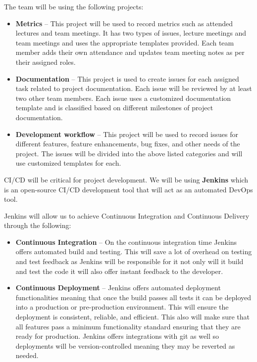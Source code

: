 \documentclass{article}
\begin{document}
The team will be using the following projects:

\begin{itemize}
\item \textbf{Metrics} -- This project will be used to record metrics such as attended lectures and team meetings. It has two types of issues, lecture meetings and team meetings and uses the appropriate templates provided. Each team member adds their own attendance and updates team meeting notes as per their assigned roles.
\item \textbf{Documentation} -- This project is used to create issues for each assigned task related to project documentation. Each issue will be reviewed by at least two other team members. Each issue uses a customized documentation template and is classified based on different milestones of project documentation. 
\item \textbf{Development workflow} -- This project will be used to record issues for different features, feature enhancements, bug fixes, and other needs of the project. The issues will be divided into the above listed categories and will use customized templates for each. 
\end{itemize}

CI/CD will be critical for project development. We will be using \textbf{Jenkins} which is an open-source CI/CD development tool that will act as an automated DevOps tool.

Jenkins will allow us to achieve Continuous Integration and Continuous Delivery through the following:
\begin{itemize}
  \item \textbf{Continuous Integration} -- On the continuous integration time Jenkins offers automated build and testing. This will save a lot of overhead on testing and test feedback as Jenkins will be responsible for it not only will it build and test the code it will also offer instant feedback to the developer.
  \item \textbf{Continuous Deployment} -- Jenkins offers automated deployment functionalities meaning that once the build passes all tests it can be deployed into a production or pre-production environment. This will ensure the deployment is consistent, reliable, and efficient. This also will make sure that all features pass a minimum functionality standard ensuring that they are ready for production. Jenkins offers integrations with git as well so deployments will be version-controlled meaning they may be reverted as needed.
\end{itemize}
\end{document}

